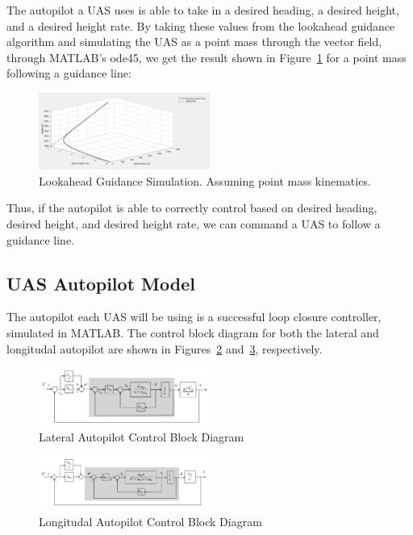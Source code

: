 The autopilot a UAS uses is able to take in a desired heading, a desired height, and a desired height rate.
By taking these values from the lookahead guidance algorithm and simulating the UAS as a point mass through the vector field, through MATLAB's ode45, we get the result shown in Figure~\ref{fig:lookahead_sim} for a point mass following a guidance line:

\begin{figure}[h]  
    \centering
    \includegraphics[width=0.5\textwidth]{images/lookahead_point.jpeg}
    \caption{Lookahead Guidance Simulation. Assuming point mass kinematics.}
    \label{fig:lookahead_sim}
\end{figure}

Thus, if the autopilot is able to correctly control based on desired heading, desired height, and desired height rate, we can command a UAS to follow a guidance line.

\subsection{UAS Autopilot Model}

The autopilot each UAS will be using is a successful loop closure controller, simulated in MATLAB.
The control block diagram for both the lateral and longitudal autopilot are shown in Figures~\ref{fig:lateral_autopilot} and~\ref{fig:longitudal_autopilot}, respectively.

\begin{figure}[h]  
    \centering
    \includegraphics[width=0.5\textwidth]{images/lateral_auto.png}
    \caption{Lateral Autopilot Control Block Diagram}
    \label{fig:lateral_autopilot}
\end{figure}

\begin{figure}[h]  
    \centering
    \includegraphics[width=0.5\textwidth]{images/long_auto.png}
    \caption{Longitudal Autopilot Control Block Diagram}
    \label{fig:longitudal_autopilot}
\end{figure}

